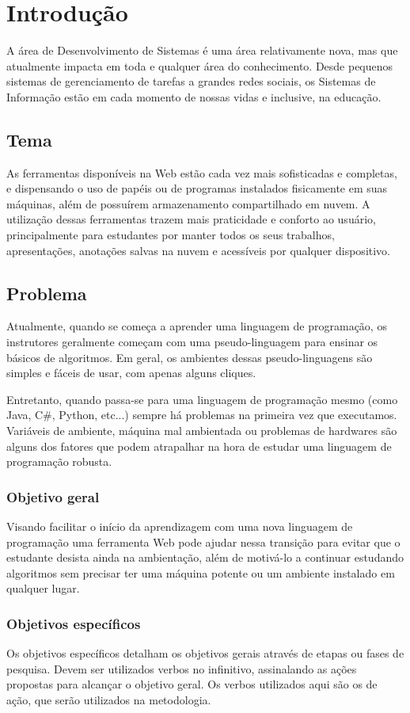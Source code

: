 \chapter{Introdução}
A área de Desenvolvimento de Sistemas é uma área relativamente nova, mas que atualmente impacta em toda e qualquer área do conhecimento. Desde pequenos sistemas de gerenciamento de tarefas a grandes redes sociais, os Sistemas de Informação estão em cada momento de nossas vidas e inclusive, na educação.

\section{Tema}
As ferramentas disponíveis na Web estão cada vez mais sofisticadas e completas, e dispensando o uso de papéis ou de programas instalados fisicamente em suas máquinas, além de possuírem armazenamento compartilhado em nuvem. A utilização dessas ferramentas trazem mais praticidade e conforto ao usuário, principalmente para estudantes por manter todos os seus trabalhos, apresentações, anotações salvas na nuvem e acessíveis por qualquer dispositivo.


\section{Problema}
Atualmente, quando se começa a aprender uma linguagem de programação, os instrutores geralmente começam com uma pseudo-linguagem para ensinar os básicos de algoritmos. Em geral, os ambientes dessas pseudo-linguagens são simples e fáceis de usar, com apenas alguns cliques.

Entretanto, quando passa-se para uma linguagem de programação mesmo (como Java, C\#, Python, etc...) sempre há problemas na primeira vez que executamos. Variáveis de ambiente, máquina mal ambientada ou problemas de hardwares são alguns dos fatores que podem atrapalhar na hora de estudar uma linguagem de programação robusta.

\subsection{Objetivo geral}
Visando facilitar o início da aprendizagem com uma nova linguagem de programação uma ferramenta Web pode ajudar nessa transição para evitar que o estudante desista ainda na ambientação, além de motivá-lo a continuar estudando algoritmos sem precisar ter uma máquina potente ou um ambiente instalado em qualquer lugar.

\subsection{Objetivos específicos}
Os objetivos específicos detalham os objetivos gerais através de etapas ou fases de pesquisa. Devem ser utilizados verbos no infinitivo, assinalando as ações propostas para alcançar o objetivo geral. Os verbos utilizados aqui são os de ação, que serão utilizados na metodologia.

